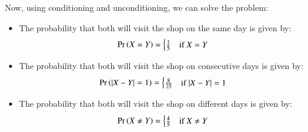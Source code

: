 \documentclass[journal,10pt,twocolumn]{IEEEtran}
\begin{document}
Now, using conditioning and unconditioning, we can solve the problem:
\begin{itemize}
    
\item  The probability that both will visit the shop on the same day is given by:
\[
\Pr\left(X = Y\right) = \begin{cases}
\frac{1}{5} & \text{if } X = Y \\
\end{cases}
\]

\item  The probability that both will visit the shop on consecutive days is given by:
\[
\Pr\left(|X - Y| = 1\right) = \begin{cases}
\frac{8}{25} & \text{if } |X - Y| = 1 \\
\end{cases}
\]
\item The probability that both will visit the shop on different days is given by:
\[
\Pr\left(X \neq Y\right) = \begin{cases}
\frac{4}{5} & \text{if } X \neq Y \\
\end{cases}
\]
\end{itemize}
\end{document}
